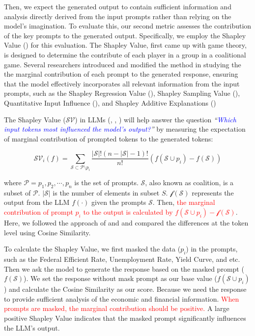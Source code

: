 Then, we expect the generated output to contain sufficient information and analysis directly derived from the input prompts rather than relying on the model's imagination. To evaluate this, our second metric assesses the contribution of the key prompts to the generated output. Specifically, we employ the Shapley Value (\cite{shapley1953value}) for this evaluation. The Shapley Value, first came up with game theory, is designed to determine the contribute of each player in a group in a coalitional game. Several researchers introduced and modified the method in studying the the marginal contribution of each prompt to the generated response, ensuring that the model effectively incorporates all relevant information from the input prompts, such as the Shapley Regression Value (\cite{lipovetsky2001analysis}), Shapley Sampling Value (\cite{vstrumbelj2014explaining}), Quantitative Input Influence (\cite{datta2016algorithmic}), and Shapley Additive Explanations (\cite{lundberg2017unified})



The Shapley Value ($\mathcal{SV}$) in LLMs (\cite{liu2023prompt}, \cite{mohammadi2024wait}, \cite{goldshmidt2024tokenshap}) will help answer the question \textit{``\textcolor{blue}{Which input tokens most influenced the model's output?}''} by measuring the expectation of marginal contribution of prompted tokens to the generated tokens:

\begin{equation*}
  \mathcal{SV}_i(f) = \sum_{\mathcal{S} \subset \mathcal{P}\setminus p_i} \frac{\left|\mathcal{S}\right|! (n - \left|\mathcal{S}\right| - 1)!}{n!} \left(f(\mathcal{S}\cup p_i) - f(\mathcal{S})\right)
\end{equation*}

where $\mathcal{P} = {p_1, p_2, \cdots, p_n}$ is the set of prompts. $\mathcal{S}$, also known as coalition, is a subset of $\mathcal{P}$. $\left|\mathcal{S}\right|$ is the number of elements in subset $S$. $\mathcal{f}(\mathcal{S})$ represents the output from the LLM $f(\cdot)$ given the prompts $\mathcal{S}$. Then, \textcolor{red}{the marginal contribution of prompt $p_i$ to the output is calculated by $f(\mathcal{S} \cup p_{i}) - \mathcal{f}(\mathcal{S})$}. Here, we followed the approach of \cite{lundberg2017unified} and \cite{goldshmidt2024tokenshap} and compared the differences at the token level using Cosine Similarity.

To calculate the Shapley Value, we first masked the data ($p_i$) in the prompts, such as the Federal Efficient Rate, Unemployment Rate, Yield Curve, and etc. Then we ask the model to generate the response based on the masked prompt ($f(\mathcal{S})$). We set the response without mask prompt as our base value ($f(\mathcal{S}\cup p_i)$) and calculate the Cosine Similarity as our score. Because we need the response to provide sufficient analysis of the economic and financial information. \textcolor{red}{When prompts are masked, the marginal contribution should be positive.} A large positive Shapley Value indicates that the masked prompt significantly influences the LLM's output.


